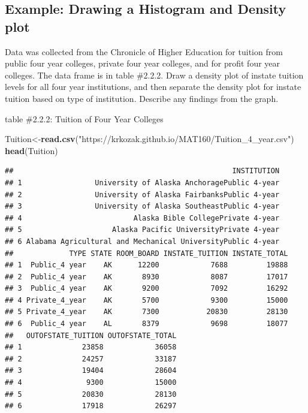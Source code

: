 \documentclass[]{book}
\newenvironment{Shaded}{\begin{snugshade}}{\end{snugshade}}
\newcommand{\KeywordTok}[1]{\textcolor[rgb]{0.13,0.29,0.53}{\textbf{#1}}}
\newcommand{\NormalTok}[1]{#1}
\newcommand{\StringTok}[1]{\textcolor[rgb]{0.31,0.60,0.02}{#1}}
\begin{document}
\hypertarget{example-drawing-a-histogram-and-density-plot-1}{%
\subsection{Example: Drawing a Histogram and Density plot}\label{example-drawing-a-histogram-and-density-plot-1}}

Data was collected from the Chronicle of Higher Education for tuition from public four year colleges, private four year colleges, and for profit four year colleges. The data frame is in table \#2.2.2. Draw a density plot of instate tuition levels for all four year institutions, and then separate the density plot for instate tuition based on type of institution. Describe any findings from the graph.

table \#2.2.2: Tuition of Four Year Colleges

\begin{Shaded}
\begin{Highlighting}[]
\NormalTok{Tuition<-}\KeywordTok{read.csv}\NormalTok{(}\StringTok{"https://krkozak.github.io/MAT160/Tuition_4_year.csv"}\NormalTok{)}
\KeywordTok{head}\NormalTok{(Tuition)}
\end{Highlighting}
\end{Shaded}

\begin{verbatim}
##                                                   INSTITUTION
## 1                 University of Alaska AnchoragePublic 4-year
## 2                 University of Alaska FairbanksPublic 4-year
## 3                 University of Alaska SoutheastPublic 4-year
## 4                          Alaska Bible CollegePrivate 4-year
## 5                     Alaska Pacific UniversityPrivate 4-year
## 6 Alabama Agricultural and Mechanical UniversityPublic 4-year
##             TYPE STATE ROOM_BOARD INSTATE_TUITION INSTATE_TOTAL
## 1  Public_4 year    AK      12200            7688         19888
## 2  Public_4 year    AK       8930            8087         17017
## 3  Public_4 year    AK       9200            7092         16292
## 4 Private_4_year    AK       5700            9300         15000
## 5 Private_4_year    AK       7300           20830         28130
## 6  Public_4 year    AL       8379            9698         18077
##   OUTOFSTATE_TUITION OUTOFSTATE_TOTAL
## 1              23858            36058
## 2              24257            33187
## 3              19404            28604
## 4               9300            15000
## 5              20830            28130
## 6              17918            26297
\end{verbatim}
\end{document}
